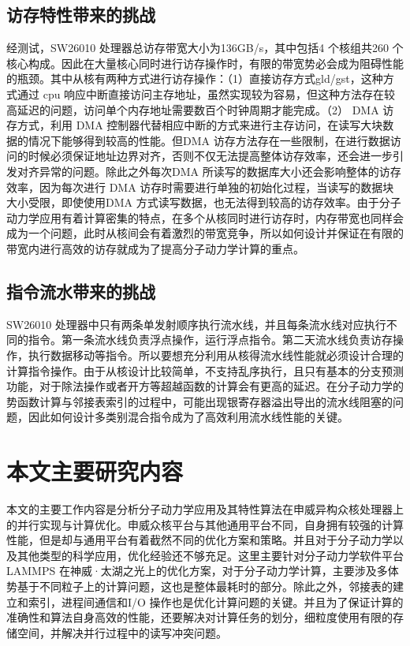 \subsection{访存特性带来的挑战}
经测试，SW26010 处理器总访存带宽大小为136GB/s，其中包括4 个核组共260 个核心构成。因此在大量核心同时进行访存操作时，有限的带宽势必会成为阻碍性能的瓶颈。其中从核有两种方式进行访存操作：（1）直接访存方式gld/gst，这种方式通过 cpu 响应中断直接访问主存地址，虽然实现较为容易，但这种方法存在较高延迟的问题，访问单个内存地址需要数百个时钟周期才能完成。（2） DMA 访存方式，利用 DMA 控制器代替相应中断的方式来进行主存访问，在读写大块数据的情况下能够得到较高的性能。但DMA 访存方法存在一些限制，在进行数据访问的时候必须保证地址边界对齐，否则不仅无法提高整体访存效率，还会进一步引发对齐异常的问题。除此之外每次DMA 所读写的数据库大小还会影响整体的访存效率，因为每次进行 DMA 访存时需要进行单独的初始化过程，当读写的数据块大小受限，即使使用DMA 方式读写数据，也无法得到较高的访存效率。由于分子动力学应用有着计算密集的特点，在多个从核同时进行访存时，内存带宽也同样会成为一个问题，此时从核间会有着激烈的带宽竞争，所以如何设计并保证在有限的带宽内进行高效的访存就成为了提高分子动力学计算的重点。

\subsection{指令流水带来的挑战}
SW26010 处理器中只有两条单发射顺序执行流水线，并且每条流水线对应执行不同的指令。第一条流水线负责浮点操作，运行浮点指令。第二天流水线负责访存操作，执行数据移动等指令。所以要想充分利用从核得流水线性能就必须设计合理的计算指令操作。由于从核设计比较简单，不支持乱序执行，且只有基本的分支预测功能，对于除法操作或者开方等超越函数的计算会有更高的延迟。在分子动力学的势函数计算与邻接表索引的过程中，可能出现银寄存器溢出导出的流水线阻塞的问题，因此如何设计多类别混合指令成为了高效利用流水线性能的关键。

\section{本文主要研究内容}
本文的主要工作内容是分析分子动力学应用及其特性算法在申威异构众核处理器上的并行实现与计算优化。申威众核平台与其他通用平台不同，自身拥有较强的计算性能，但是却与通用平台有着截然不同的优化方案和策略。并且对于分子动力学以及其他类型的科学应用，优化经验还不够充足。这里主要针对分子动力学软件平台LAMMPS 在神威·太湖之光上的优化方案，对于分子动力学计算，主要涉及多体势基于不同粒子上的计算问题，这也是整体最耗时的部分。除此之外，邻接表的建立和索引，进程间通信和I/O 操作也是优化计算问题的关键。并且为了保证计算的准确性和算法自身高效的性能，还要解决对计算任务的划分，细粒度使用有限的存储空间，并解决并行过程中的读写冲突问题。

